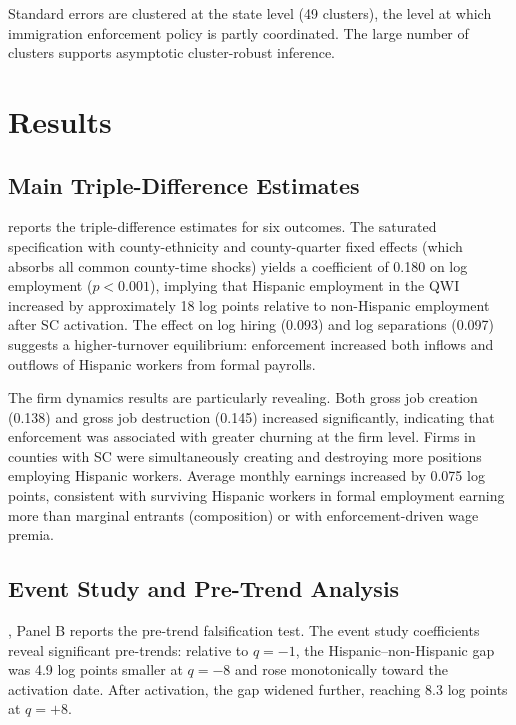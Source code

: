 \documentclass[12pt]{article}
\begin{document}
Standard errors are clustered at the state level (49 clusters), the level at which immigration enforcement policy is partly coordinated. The large number of clusters supports asymptotic cluster-robust inference.


\section{Results}
\label{sec:results}

\subsection{Main Triple-Difference Estimates}



 reports the triple-difference estimates for six outcomes. The saturated specification with county-ethnicity and county-quarter fixed effects (which absorbs all common county-time shocks) yields a coefficient of 0.180 on log employment ($p < 0.001$), implying that Hispanic employment in the QWI increased by approximately 18 log points relative to non-Hispanic employment after SC activation. The effect on log hiring (0.093) and log separations (0.097) suggests a higher-turnover equilibrium: enforcement increased both inflows and outflows of Hispanic workers from formal payrolls.

The firm dynamics results are particularly revealing. Both gross job creation (0.138) and gross job destruction (0.145) increased significantly, indicating that enforcement was associated with greater churning at the firm level. Firms in counties with SC were simultaneously creating and destroying more positions employing Hispanic workers. Average monthly earnings increased by 0.075 log points, consistent with surviving Hispanic workers in formal employment earning more than marginal entrants (composition) or with enforcement-driven wage premia.

\subsection{Event Study and Pre-Trend Analysis}

, Panel B reports the pre-trend falsification test. The event study coefficients reveal significant pre-trends: relative to $q = -1$, the Hispanic--non-Hispanic gap was 4.9 log points smaller at $q = -8$ and rose monotonically toward the activation date. After activation, the gap widened further, reaching 8.3 log points at $q = +8$.
\end{document}
